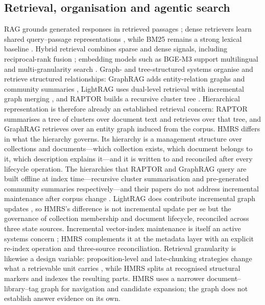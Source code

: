 \subsection{Retrieval, organisation and agentic search}
RAG grounds generated responses in retrieved passages \citep{rag-lewis}; dense
retrievers learn shared query--passage representations \citep{dpr}, while BM25
remains a strong lexical baseline \citep{bm25}. Hybrid retrieval combines
sparse and dense signals, including reciprocal-rank fusion
\citep{rrf-cormack}; embedding models such as BGE-M3 support multilingual and
multi-granularity search \citep{bge-m3}. Graph- and tree-structured systems
organise and retrieve structured relationships: GraphRAG adds entity-relation
graphs and community summaries \citep{graphrag}, LightRAG uses dual-level
retrieval with incremental graph merging \citep{lightrag}, and RAPTOR builds a
recursive cluster tree \citep{raptor}. Hierarchical representation is therefore already an
established retrieval concern: RAPTOR summarises a tree of clusters over
document text and retrieves over that tree, and GraphRAG retrieves over an
entity graph induced from the corpus. HMRS differs in what the hierarchy
governs. Its hierarchy is a management structure over collections and
documents---which collection exists, which document belongs to it, which
description explains it---and it is written to and reconciled after every
lifecycle operation. The hierarchies that RAPTOR and GraphRAG query are built
offline at index time---recursive cluster summarisation and pre-generated
community summaries respectively---and their papers do not address
incremental maintenance after corpus change \cite{raptor,graphrag}. LightRAG
does contribute incremental graph updates \citep{lightrag}, so HMRS's
difference is not incremental update per se but the governance of collection
membership and document lifecycle, reconciled across three state sources.
Incremental vector-index maintenance is itself an
active systems concern \cite{singh2021freshdiskann,xu2023spfresh}; HMRS
complements it at the metadata layer with an explicit re-index operation and
three-source reconciliation. Retrieval granularity is likewise a design
variable: proposition-level and late-chunking strategies change what a
retrievable unit carries \cite{chen2024dense,gunther2024late}, while HMRS
splits at recognised structural markers and indexes the resulting parts.
HMRS uses a
narrower document--library--tag graph for navigation and candidate
expansion; the graph does not establish answer evidence on its own.

